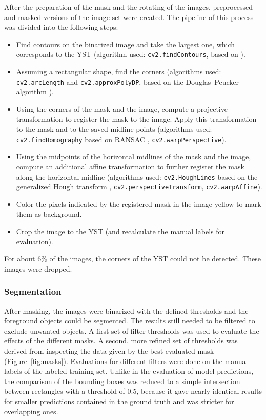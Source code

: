\documentclass[12pt, a4paper]{article}
\begin{document}
After the preparation of the mask and the rotating of the images, preprocessed and masked versions of the image set were created. The pipeline of this process was divided into the following steps:
\begin{itemize}
    \item Find contours on the binarized image and take the largest one, which corresponds to the YST (algorithm used: \texttt{cv2.findContours}, based on \cite{suzuki1985border}).
    \item Assuming a rectangular shape, find the corners (algorithms used: \texttt{cv2.arcLength} and \texttt{cv2.approxPolyDP}, based on the Douglas–Peucker algorithm \cite{douglas1973algorithms}).
    \item Using the corners of the mask and the image, compute a projective transformation to register the mask to the image. Apply this transformation to the mask and to the saved midline points (algorithms used: \texttt{cv2.findHomography} based on RANSAC \cite{fischler1981ransac}, \texttt{cv2.warpPerspective}).
    \item Using the midpoints of the horizontal midlines of the mask and the image, compute an additional affine transformation to further register the mask along the horizontal midline (algorithms used: \texttt{cv2.HoughLines} based on the generalized Hough transform \cite{duda1972use}, \texttt{cv2.perspectiveTransform}, \texttt{cv2.warpAffine}).
    \item Color the pixels indicated by the registered mask in the image yellow to mark them as background.
    \item Crop the image to the YST (and recalculate the manual labels for evaluation).
\end{itemize}


For about 6\% of the images, the corners of the YST could not be detected. These images were dropped.

\subsubsection{Segmentation}
\label{sec:segmentation}

After masking, the images were binarized with the defined thresholds and the foreground objects could be segmented. The results still needed to be filtered to exclude unwanted objects. A first set of filter thresholds was used to evaluate the effects of the different masks. A second, more refined set of thresholds was derived from inspecting the data given by the best-evaluated mask (Figure~\ref{fig:masks}). Evaluations for different filters were done on the manual labels of the labeled training set. Unlike in the evaluation of model predictions, the comparison of the bounding boxes was reduced to a simple intersection between rectangles with a threshold of 0.5, because it gave nearly identical results for smaller predictions contained in the ground truth and was stricter for overlapping ones.
\end{document}
